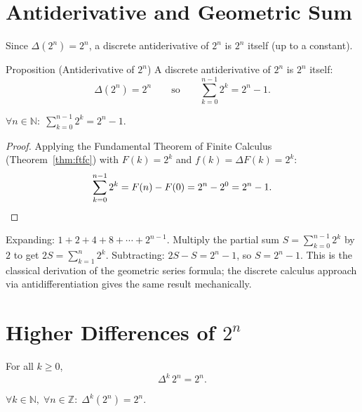 \section*{Antiderivative and Geometric Sum}

Since \(\Delta(2^n) = 2^n\), a discrete antiderivative of \(2^n\) is \(2^n\)
itself (up to a constant).

\begin{propositionbox}{Proposition (Antiderivative of \(2^n\))}
A discrete antiderivative of \(2^n\) is \(2^n\) itself:
\[
\Delta(2^n) = 2^n
\qquad \text{so} \qquad
\sum_{k=0}^{n-1} 2^k = 2^n - 1.
\]
\end{propositionbox}
\label{prop:antideriv-two-n}

\begin{remark*}
\(\forall n \in \mathbb{N}:\;
\displaystyle\sum_{k=0}^{n-1} 2^k = 2^n - 1\).
\end{remark*}

\begin{proof}
Applying the Fundamental Theorem of Finite Calculus
(Theorem~\ref{thm:ftfc}) with \(F(k) = 2^k\) and \(f(k) = \Delta F(k) = 2^k\):
\[
\sum_{k=0}^{n-1} 2^k = F(n) - F(0) = 2^n - 2^0 = 2^n - 1. \qedhere
\]
\end{proof}

\begin{remark*}
Expanding: \(1 + 2 + 4 + 8 + \cdots + 2^{n-1}\). Multiply the partial sum
\(S = \sum_{k=0}^{n-1}2^k\) by \(2\) to get \(2S = \sum_{k=1}^{n}2^k\).
Subtracting: \(2S - S = 2^n - 1\), so \(S = 2^n - 1\). This is the
classical derivation of the geometric series formula; the discrete calculus
approach via antidifferentiation gives the same result mechanically.
\end{remark*}

\section*{Higher Differences of \(2^n\)}

\begin{proposition}
\label{prop:higher-diff-two-n}
For all \(k \ge 0\),
\[
\Delta^k\, 2^n = 2^n.
\]
\end{proposition}

\begin{remark*}
\(\forall k \in \mathbb{N},\; \forall n \in \mathbb{Z}:\; \Delta^k(2^n) = 2^n\).
\end{remark*}

